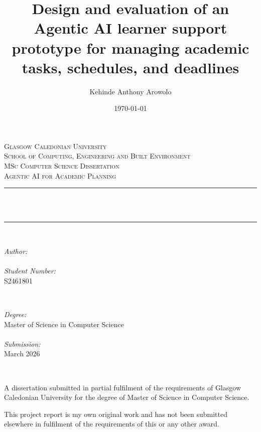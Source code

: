 \documentclass[12pt]{article}
\title{Design and evaluation of an Agentic AI learner support prototype for managing academic tasks, schedules, and deadlines}	%
\author{Kehinde Anthony Arowolo}		%
\date{\today}	%
\makeatletter
\let\thetitle\@title
\let\theauthor\@author
\makeatother
\begin{document}
\onehalfspacing

\begin{titlepage}
	\centering
    \vspace*{0.5 cm}
    \textsc{\LARGE Glasgow Caledonian University}\\[0.3 cm]
    \textsc{\Large School of Computing, Engineering and Built Environment}\\[1.7 cm]
	\textsc{\Large MSc Computer Science Dissertation}\\[0.5 cm]		
	\textsc{\large Agentic AI for Academic Planning}\\[0.5 cm]
	\rule{\linewidth}{0.2 mm} \\[0.4 cm]
	{ \huge \bfseries \thetitle}\\
	\rule{\linewidth}{0.2 mm} \\[1.5 cm]
	
	\begin{minipage}{0.4\textwidth}
		\begin{flushleft} \large
			\emph{Author:}\\
			\theauthor
            \\
            \emph{Student Number:}\\
            S2461801
			\end{flushleft}
			\end{minipage}~
			\begin{minipage}{0.4\textwidth}
			\begin{flushright} \large
            \emph{Degree:}\\
            Master of Science in Computer Science\\
            \\
            \emph{Submission:}\\
            March 2026
		\end{flushright}
	\end{minipage}\\[2 cm]
	
	\vfill

    \begin{minipage}{0.95\textwidth}
    \small
    A dissertation submitted in partial fulfilment of the requirements of Glasgow Caledonian University for the degree of Master of Science in Computer Science.

    \vspace{3mm}
    This project report is my own original work and has not been submitted elsewhere in fulfilment of the requirements of this or any other award.
    \end{minipage}

\end{titlepage}
\end{document}
